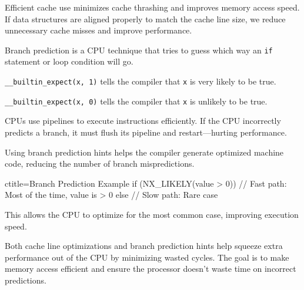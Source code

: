 \begin{NexMainBox}
	\begin{NexMainBox}[dark, crnA, title=\textbf{Why Does Cache Line Size Matter?}]
		Efficient cache use minimizes cache thrashing and improves memory access speed. If data structures are aligned properly to match the cache line size, we reduce unnecessary cache misses and improve performance.
	\end{NexMainBox}
	\begin{NexMainBox}[dark, crnA, title={Branch Prediction Macros (NX_LIKELY and NX_UNLIKELY)}]
		Branch prediction is a CPU technique that tries to guess which way an \texttt{if} statement or loop condition will go.

		\texttt{__builtin_expect(x, 1)} tells the compiler that \texttt{x} is very likely to be true.

		\texttt{__builtin_expect(x, 0)} tells the compiler that \texttt{x} is unlikely to be true.
	\end{NexMainBox}

	\begin{NexMainBox}[dark, crnA, title={Why is this important?}]
		CPUs use pipelines to execute instructions efficiently. If the CPU incorrectly predicts a branch, it must flush its pipeline and restart—hurting performance.

		Using branch prediction hints helps the compiler generate optimized machine code, reducing the number of branch mispredictions.
	\end{NexMainBox}
\end{NexMainBox}

\begin{NexCodeBox}{c}{title={Branch Prediction Example}}
if (NX_LIKELY(value > 0)) {
	// Fast path: Most of the time, value is > 0
} else {
	// Slow path: Rare case
}
\end{NexCodeBox}

\begin{NexMainBox}
	\begin{NexMainBox}
		This allows the CPU to optimize for the most common case, improving execution speed.
	\end{NexMainBox}

	\begin{NexMainBox}[dark, crnA, title={Final Thoughts}]
		Both cache line optimizations and branch prediction hints help squeeze extra performance out of the CPU by minimizing wasted cycles. The goal is to make memory access efficient and ensure the processor doesn't waste time on incorrect predictions.
	\end{NexMainBox}
\end{NexMainBox}


